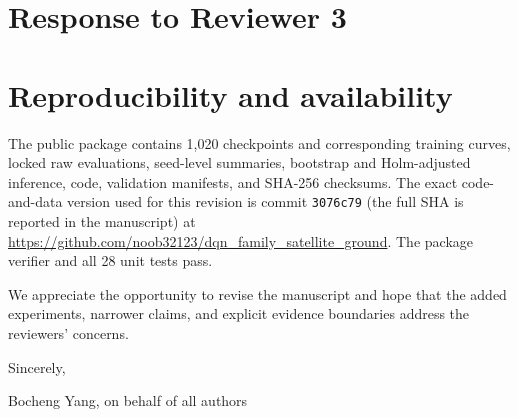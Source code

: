 \documentclass[11pt]{article}
\begin{document}
\section*{Response to Reviewer 3}


\section*{Reproducibility and availability}

The public package contains 1,020 checkpoints and corresponding training curves, locked raw evaluations, seed-level summaries, bootstrap and Holm-adjusted inference, code, validation manifests, and SHA-256 checksums. The exact code-and-data version used for this revision is commit \texttt{3076c79} (the full SHA is reported in the manuscript) at \url{https://github.com/noob32123/dqn_family_satellite_ground}. The package verifier and all 28 unit tests pass.

We appreciate the opportunity to revise the manuscript and hope that the added experiments, narrower claims, and explicit evidence boundaries address the reviewers' concerns.

Sincerely,

\vspace{1em}
Bocheng Yang, on behalf of all authors
\end{document}
